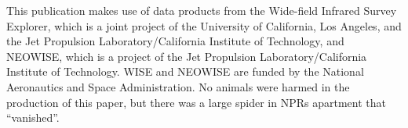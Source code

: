 \documentclass[a4paper,fleqn,usenatbib]{mnras}
\begin{document}
This publication makes use of data products from the Wide-field
Infrared Survey Explorer, which is a joint project of the University
of California, Los Angeles, and the Jet Propulsion
Laboratory/California Institute of Technology, and NEOWISE, which is a
project of the Jet Propulsion Laboratory/California Institute of
Technology. WISE and NEOWISE are funded by the National Aeronautics
and Space Administration. No animals were harmed in the production of
this paper, but there was a large spider in NPRs apartment that
``vanished''.





\bsp	%
\label{lastpage}
\end{document}
